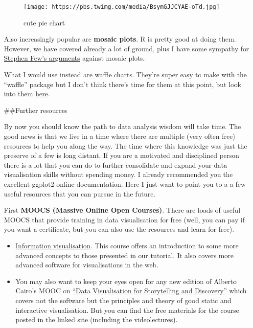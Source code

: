\documentclass[]{book}
\theoremstyle{definition}
\theoremstyle{definition}
\theoremstyle{definition}
\theoremstyle{remark}
\begin{document}
\begin{figure}
\centering
\texttt{[image: https://pbs.twimg.com/media/BsymGJJCYAE-oTd.jpg]}
\caption{cute pie chart}
\end{figure}

Also increasingly popular are \textbf{mosaic plots}. R is pretty good at
doing them. However, we have covered already a lot of ground, plus I
have some sympathy for
\href{http://www.perceptualedge.com/articles/visual_business_intelligence/are_mosaic_plots_worthwhile.pdf}{Stephen
Few's arguments} against mosaic plots.

What I would use instead are waffle charts. They're super easy to make
with the ``waffle'' package but I don't think there's time for them at
this point, but look into them
\href{https://www.r-bloggers.com/making-waffle-charts-in-r-with-the-new-waffle-package/}{here}.

\#\#Further resources

By now you should know the path to data analysis wisdom will take time.
The good news is that we live in a time where there are multiple (very
often free) resources to help you along the way. The time where this
knowledge was just the preserve of a few is long distant. If you are a
motivated and disciplined person there is a lot that you can do to
further consolidate and expand your data visualisation skills without
spending money. I already recommended you the excellent ggplot2 online
documentation. Here I just want to point you to a a few useful resources
that you can pursue in the future.

First \textbf{MOOCS (Massive Online Open Courses)}. There are loads of
useful MOOCS that provide training in data visualisation for free (well,
you can pay if you want a certificate, but you can also use the
resources and learn for free).

\begin{itemize}
\item
  \href{https://www.coursera.org/specializations/information-visualization}{Information
  visualisation}. This course offers an introduction to some more
  advanced concepts to those presented in our tutorial. It also covers
  more advanced software for visualisations in the web.
\item
  You may also want to keep your eyes open for any new edition of
  Alberto Cairo's MOOC on
  \href{https://journalismcourses.org/data-viz-course-material.html}{``Data
  Visualisation for Storytelling and Discovery''} which covers not the
  software but the principles and theory of good static and interactive
  visualisation. But you can find the free materials for the course
  posted in the linked site (including the videolectures).
\end{itemize}
\end{document}
